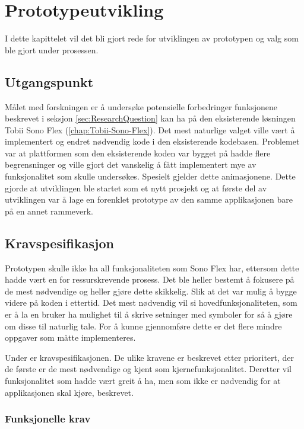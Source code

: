  
 
\chapter{Prototypeutvikling} 

I dette kapittelet vil det bli gjort rede for utviklingen av prototypen og valg som ble gjort under prosessen. 
 
 
\section{Utgangspunkt} 
\label{sec:utgangspunkt} 
 
 
Målet med forskningen er å undersøke potensielle forbedringer funksjonene beskrevet i seksjon \ref{sec:ResearchQuestion} kan ha på den eksisterende løsningen Tobii Sono Flex (\ref{chap:Tobii-Sono-Flex}). Det mest naturlige valget ville vært å implementert og endret nødvendig kode i den eksisterende kodebasen. Problemet var at plattformen som den eksisterende koden var bygget på hadde flere begrensninger og ville gjort det vanskelig å fått implementert mye av funksjonalitet som skulle undersøkes. Spesielt gjelder dette animasjonene. Dette gjorde at utviklingen ble startet som et nytt prosjekt og at første del av utviklingen var å lage en forenklet prototype av den samme applikasjonen bare på en annet rammeverk. 
 
 
\section{Kravspesifikasjon} 
 
Prototypen skulle ikke ha all funksjonaliteten som Sono Flex har, ettersom dette hadde vært en for ressurskrevende prosess. Det ble heller bestemt å fokusere på de mest nødvendige og heller gjøre dette skikkelig. Slik at det var mulig å bygge videre på koden i ettertid. Det mest nødvendig vil si hovedfunksjonaliteten, som er å la en bruker ha mulighet til å skrive setninger med symboler for så å gjøre om disse til naturlig tale. For å kunne gjennomføre dette er det flere mindre oppgaver som måtte implementeres. 

Under er kravspesifikasjonen. De ulike kravene er beskrevet etter prioritert, der de første er de mest nødvendige og kjent som kjernefunksjonalitet. Deretter vil funksjonalitet som hadde vært greit å ha, men som ikke er nødvendig for at applikasjonen skal kjøre, beskrevet.  

 
\subsection{Funksjonelle krav} 
 
